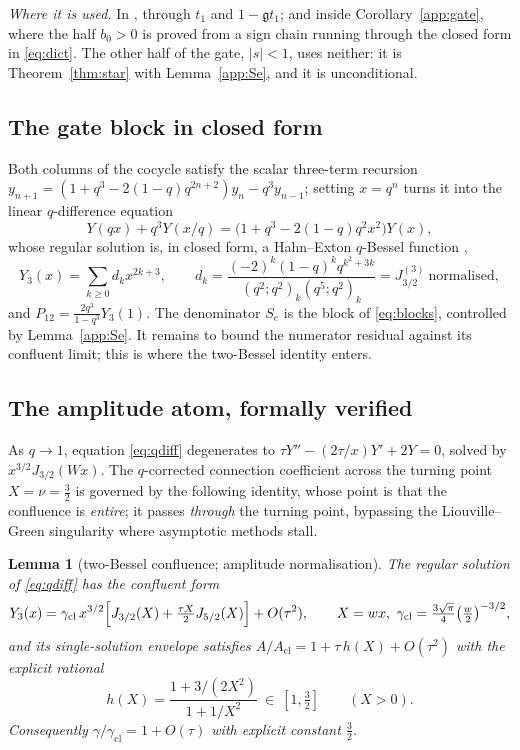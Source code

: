 \documentclass[11pt]{article}
\theoremstyle{plain}
\newtheorem{lemma}[theorem]{Lemma}
\theoremstyle{definition}
\theoremstyle{remark}
\begin{document}
\emph{Where it is used.} In {\cite[Theorem ``closed form of the junction pairing'', \textup{thm:RJ}]{Bonfioli2026bA}}, through $t_1$ and $1-\mathfrak gt_1$; and inside
Corollary~\ref{app:gate}, where the half $b_0>0$ is proved from a sign chain running through the
closed form in \eqref{eq:dict}. The other half of the gate, $|s|<1$, uses neither: it is
Theorem~\ref{thm:star} with Lemma~\ref{app:Se}, and it is unconditional.

\subsection{The gate block in closed form}\label{sec:gateblock}

Both columns of the cocycle satisfy the scalar three-term recursion
$y_{n+1}=(1+q^3-2(1-q)q^{2n+2})y_n-q^3y_{n-1}$; setting $x=q^n$ turns it into the linear
$q$-difference equation
\begin{equation}\label{eq:qdiff}
  Y(qx)+q^3Y(x/q)=\bigl(1+q^3-2(1-q)q^2x^2\bigr)Y(x),
\end{equation}
whose regular solution is, in closed form, a Hahn--Exton $q$-Bessel function
\cite{Hahn1953,Exton1978,KS1992},
\begin{equation}\label{eq:p12closed}
  Y_3(x)=\sum_{k\ge0}d_kx^{2k+3},\qquad
  d_k=\frac{(-2)^k(1-q)^kq^{k^2+3k}}{(q^2;q^2)_k(q^5;q^2)_k}=J^{(3)}_{3/2}\ \text{normalised},
\end{equation}
and $P_{12}=\tfrac{2q^3}{1-q^3}Y_3(1)$. The denominator $S_e$ is the block of \eqref{eq:blocks},
controlled by Lemma~\ref{app:Se}. It remains to bound the numerator residual against its confluent
limit; this is where the two-Bessel identity enters.

\subsection{The amplitude atom, formally verified}

As $q\to1$, equation \eqref{eq:qdiff} degenerates to $\tau Y''-(2\tau/x)Y'+2Y=0$, solved by
$x^{3/2}J_{3/2}(Wx)$. The $q$-corrected connection coefficient across the turning point $X=\nu=\tfrac32$
is governed by the following identity, whose point is that the confluence is \emph{entire}; it
passes \emph{through} the turning point, bypassing the Liouville--Green singularity where asymptotic
methods stall.

\begin{lemma}[two-Bessel confluence; amplitude normalisation]\label{lem:atomN}
The regular solution of \eqref{eq:qdiff} has the confluent form
\[
   Y_3(x)=\gamma_{\mathrm{cl}}\,x^{3/2}\Bigl[J_{3/2}(X)+\tfrac{\tau X}2J_{5/2}(X)\Bigr]+O(\tau^2),
   \qquad X=wx,\ \gamma_{\mathrm{cl}}=\tfrac{3\sqrt\pi}4\bigl(\tfrac w2\bigr)^{-3/2},
\]
and its single-solution envelope satisfies $A/A_{\mathrm{cl}}=1+\tau\,h(X)+O(\tau^2)$ with the
\emph{explicit rational}
\[
   h(X)=\frac{1+3/(2X^2)}{1+1/X^2}\ \in\ [1,\tfrac32]\qquad(X>0).
\]
Consequently $\gamma/\gamma_{\mathrm{cl}}=1+O(\tau)$ with explicit constant $\tfrac32$.
\end{lemma}
\end{document}
